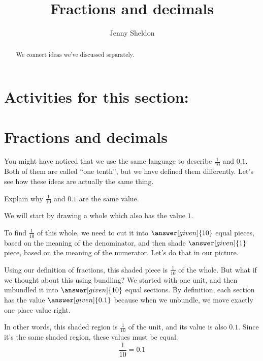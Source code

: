 \documentclass{ximera}
\title{Fractions and decimals}
\author{Jenny Sheldon}
\begin{document}
\begin{abstract}
We connect ideas we've discussed separately.
\end{abstract}
\maketitle

\section{Activities for this section:} 




\section{Fractions and decimals}

You might have noticed  that we use the same language to describe $\frac{1}{10}$ and $0.1$. Both of them are called ``one tenth'', but we have defined them differently. Let's see how these ideas are actually the same thing.

\begin{example}
Explain why $\frac{1}{10}$ and $0.1$ are the same value. 

We will start by drawing a whole which also has the value $1$.
\begin{image}
\end{image}

To find $\frac{1}{10}$ of this whole, we need to cut it into $\answer[given]{10}$ equal pieces, based on the meaning of the denominator, and then shade $\answer[given]{1}$ piece, based on the meaning of the numerator. Let's do that in our picture.
\begin{image}
\end{image}
Using our definition of fractions, this shaded piece is $\frac{1}{10}$ of the whole. But what if we thought about this using bundling? We started with one unit, and then unbundled it into $\answer[given]{10}$ equal sections. By definition, each section has the value $\answer[given]{0.1}$ because when we unbundle, we move exactly one place value right.

In other words, this shaded region is $\frac{1}{10}$ of the unit, and its value is also $0.1$. Since it's the same shaded region, these values must be equal.
\[
\frac{1}{10} = 0.1
\]
\end{example}
\end{document}
